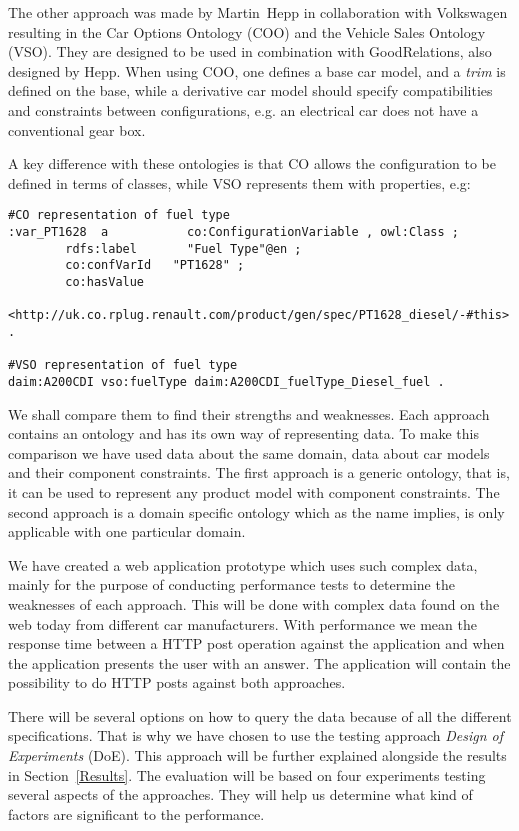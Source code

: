 \documentclass{llncs}
\begin{document}
The other approach was made by Martin~Hepp in collaboration with
Volkswagen resulting in the Car Options Ontology (COO) \cite{COO} and
the Vehicle Sales Ontology (VSO). They are designed to be used in
combination with GoodRelations, also designed by Hepp. When using COO,
one defines a base car model, and a \emph{trim} is defined on the
base, while a derivative car model should specify compatibilities and
constraints between configurations, e.g. an electrical car does not
have a conventional gear box.

A key difference with these ontologies is that CO allows the
configuration to be defined in terms of classes, while VSO
represents them with properties, e.g:
\begin{lstlisting}[basicstyle=\tiny, frame=single]
#CO representation of fuel type
:var_PT1628  a           co:ConfigurationVariable , owl:Class ;
        rdfs:label       "Fuel Type"@en ;
        co:confVarId   "PT1628" ;
        co:hasValue    
	    <http://uk.co.rplug.renault.com/product/gen/spec/PT1628_diesel/-#this> .

#VSO representation of fuel type
daim:A200CDI vso:fuelType daim:A200CDI_fuelType_Diesel_fuel .
\end{lstlisting}



We shall compare them to find their strengths and weaknesses. Each
approach contains an ontology and has its own way of representing
data.  To make this comparison we have used data about the same
domain, data about car models and their component constraints.  The
first approach is a generic ontology, that is, it can be used to
represent any product model with component constraints. The second
approach is a domain specific ontology which as the name implies, is
only applicable with one particular domain. 

We have created a web application prototype which uses such complex
data, mainly for the purpose of conducting performance tests to
determine the weaknesses of each approach. This will be done with
complex data found on the web today from different car manufacturers.
With performance we mean the response time between a HTTP post
operation against the application and when the application presents
the user with an answer. The application will contain the possibility
to do HTTP posts against both approaches.

There will be several options on how to query the data because of all
the different specifications.  That is why we have chosen to use the
testing approach \emph{Design of Experiments} (DoE). This approach
will be further explained alongside the results in
Section~\ref{Results}. The evaluation will be based on four
experiments testing several aspects of the approaches. They will help
us determine what kind of factors are significant to the performance.
\end{document}
